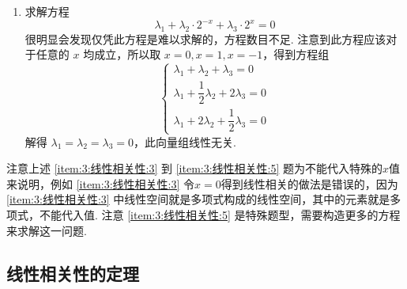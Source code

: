 \begin{solution}
\begin{enumerate}
        \item 求解方程
              \[\lambda_1 + \lambda_2·2^{-x} + \lambda_3·2^x = 0\]
              很明显会发现仅凭此方程是难以求解的，方程数目不足. 注意到此方程应该对于任意的 $x$ 均成立，所以取 $x = 0, x = 1, x = -1$，得到方程组
              \[ \begin{cases}
                      \lambda_1 + \lambda_2 + \lambda_3 = 0              \\[1ex]
                      \lambda_1 + \dfrac{1}{2}\lambda_2 + 2\lambda_3 = 0 \\[1ex]
                      \lambda_1 + 2\lambda_2 + \dfrac{1}{2}\lambda_3 = 0
                  \end{cases} \]
              解得 $\lambda_1 = \lambda_2 = \lambda_3 = 0$，此向量组线性无关.
    \end{enumerate}
\end{solution}
注意上述 \ref*{item:3:线性相关性:3} 到 \ref*{item:3:线性相关性:5} 题为不能代入特殊的$x$值来说明，例如 \ref*{item:3:线性相关性:3} 令$x=0$得到线性相关的做法是错误的，因为\ref*{item:3:线性相关性:3} 中线性空间就是多项式构成的线性空间，其中的元素就是多项式，不能代入值. 注意 \ref*{item:3:线性相关性:5} 是特殊题型，需要构造更多的方程来求解这一问题.

\subsection{线性相关性的定理}

